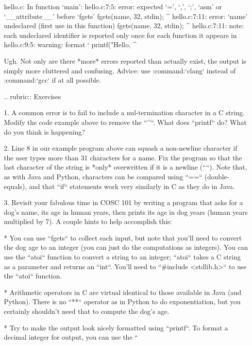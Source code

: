     hello.c: In function ‘main’:
    hello.c:7:5: error: expected ‘=’, ‘,’, ‘;’, ‘asm’ or ‘__attribute__’ before ‘fgets’
         fgets(name, 32, stdin);
         ^
    hello.c:7:11: error: ‘name’ undeclared (first use in this function)
         fgets(name, 32, stdin);
               ^
    hello.c:7:11: note: each undeclared identifier is reported only once for each function it appears in
    hello.c:9:5: warning: format ‘%
         printf("Hello, %
     ^

Ugh.  Not only are there *more* errors reported than actually exist, the output is simply more cluttered and confusing.  Advice: use :command:`clang` instead of :command:`gcc` if at all possible.  


.. rubric:: Exercises

1.  A common error is to fail to include a nul-termination character in a C string.  Modify the code example above to remove the ``'\0'``.  What does ``printf`` do?  What do you think is happening?

2.  Line 8 in our example program above can squash a non-newline character if the user types more than 31 characters for a name.  Fix the program so that the last character of the string is *only* overwritten if it is a newline (``\n``).  Note that, as with Java and Python, characters can be compared using ``==`` (double-equals), and that ``if`` statements work very similarly in C as they do in Java.

3.  Revisit your fabulous time in COSC 101 by writing a program that asks for a dog's name, its age in human years, then prints its age in dog years (human years multiplied by 7).  A couple hints to help accomplish this:
 
    * You can use ``fgets`` to collect each input, but note that you'll need to convert the dog age to an integer (you can just do the computations as integers).  You can use the ``atoi`` function to convert a string to an integer; ``atoi`` takes a C string as a parameter and returns an ``int``.  You'll need to ``#include <stdlib.h>`` to use the ``atoi`` function.

    * Arithmetic operators in C are virtual identical to those available in Java (and Python).  There is no ``**`` operator as in Python to do exponentiation, but you certainly shouldn't need that to compute the dog's age.

    * Try to make the output look nicely formatted using ``printf``.  To format a decimal integer for output, you can use the ``%

